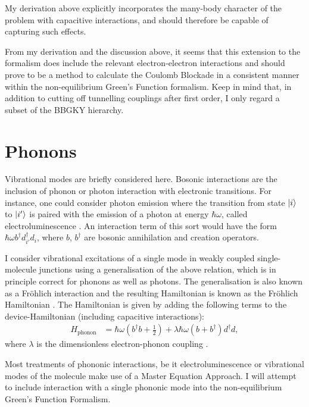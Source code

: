 My derivation above explicitly incorporates the many-body character of the problem with capacitive interactions, and should therefore be capable of capturing such effects.

From my derivation and the discussion above, it seems that this extension to the formalism does include the relevant electron-electron interactions and should prove to be a method to calculate the Coulomb Blockade in a consistent manner within the non-equilibrium Green's Function formalism. Keep in mind that, in addition to cutting off tunnelling couplings after first order, I only regard a subset of the BBGKY hierarchy.



\section{Phonons}
\label{sec:phononic}

Vibrational modes are briefly considered here. Bosonic interactions are the inclusion of phonon or photon interaction with electronic transitions. For instance, one could consider photon emission where the transition from state $\ket{i}$ to $\ket{i'}$ is paired with the emission of a photon at energy $\hbar \omega$, called electroluminescence \cite{electroluminescence}. An interaction term of this sort would have the form $\hbar\omega b^\dagger d_{i'}^\dagger d_i$, where $b$, $b^\dagger$ are bosonic annihilation and creation operators.

I consider vibrational excitations of a single mode in weakly coupled single-molecule junctions using a generalisation of the above relation, which is in principle correct for phonons as well as photons. The generalisation is also known as a Fr\"ohlich interaction and the resulting Hamiltonian is known as the Fr\"ohlich Hamiltonian \cite{frohlich}. The Hamiltonian is given by adding the following terms to the device-Hamiltonian (including capacitive interactions):
\begin{align}
H_\text{phonon} &= \hbar \omega \left(b^\dagger b + \frac{1}{2}\right) + \lambda \hbar \omega (b + b^\dagger) d^\dagger d, \label{eq:phononhamiltonian}
\end{align}
where $\lambda$ is the dimensionless electron-phonon coupling \cite{kaspermothpoulsen}.

Most treatments of phononic interactions, be it electroluminescence \cite{electroluminescence} or vibrational modes of the molecule \cite{vibrationcomputation} make use of a Master Equation Approach. I will attempt to include interaction with a single phononic mode into the non-equilibrium Green's Function Formalism.

